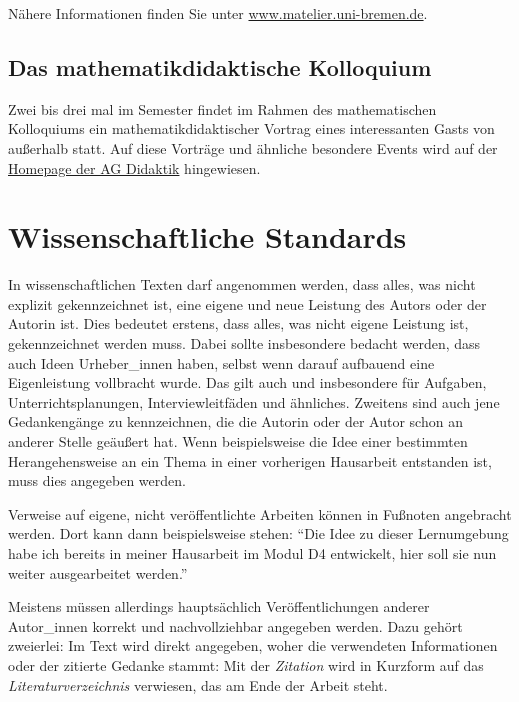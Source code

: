\documentclass[ngerman,bibliography=totoc,oneside,12pt,a4paper]{scrbook}
\begin{document}
Nähere Informationen finden Sie unter
\href{https://www.matelier.uni-bremen.de}{www.matelier.uni-bremen.de}.

\section{Das mathematikdidaktische
Kolloquium}\label{das-mathematikdidaktische-kolloquium}

Zwei bis drei mal im Semester findet im Rahmen des mathematischen
Kolloquiums ein mathematikdidaktischer Vortrag eines interessanten Gasts
von außerhalb statt. Auf diese Vorträge und ähnliche besondere Events
wird auf der \href{http://www.math.uni-bremen.de/didaktik/}{Homepage der
AG Didaktik} hingewiesen.

\chapter{Wissenschaftliche Standards}\label{wissenschaftliche-standards}

In wissenschaftlichen Texten darf angenommen werden, dass alles, was
nicht explizit gekennzeichnet ist, eine eigene und neue Leistung des
Autors oder der Autorin ist. Dies bedeutet erstens, dass alles, was
nicht eigene Leistung ist, gekennzeichnet werden muss. Dabei sollte
insbesondere bedacht werden, dass auch Ideen Urheber\_innen haben,
selbst wenn darauf aufbauend eine Eigenleistung vollbracht wurde. Das
gilt auch und insbesondere für Aufgaben, Unterrichtsplanungen,
Interviewleitfäden und ähnliches. Zweitens sind auch jene Gedankengänge
zu kennzeichnen, die die Autorin oder der Autor schon an anderer Stelle
geäußert hat. Wenn beispielsweise die Idee einer bestimmten
Herangehensweise an ein Thema in einer vorherigen Hausarbeit entstanden
ist, muss dies angegeben werden.

Verweise auf eigene, nicht veröffentlichte Arbeiten können in Fußnoten
angebracht werden. Dort kann dann beispielsweise stehen: \enquote{Die
Idee zu dieser Lernumgebung habe ich bereits in meiner Hausarbeit im
Modul D4 entwickelt, hier soll sie nun weiter ausgearbeitet werden.}

Meistens müssen allerdings hauptsächlich Veröffentlichungen anderer
Autor\_innen korrekt und nachvollziehbar angegeben werden. Dazu gehört
zweierlei: Im Text wird direkt angegeben, woher die verwendeten
Informationen oder der zitierte Gedanke stammt: Mit der \emph{Zitation}
wird in Kurzform auf das \emph{Literaturverzeichnis} verwiesen, das am
Ende der Arbeit steht.
\end{document}
